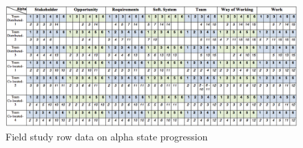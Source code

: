 \begin{figure}[h]
\centering
\includegraphics[width=6.80in]{project_steering_images/FieldStudyRowData.png}
\caption{Field study row data on alpha state progression}
\label{FieldStudyRowData}
\end{figure}




